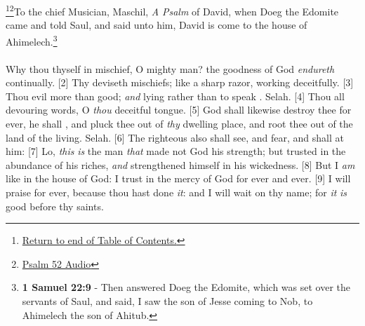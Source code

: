 \footnote{\textcolor[rgb]{0.00,0.25,0.00}{\hyperlink{TOC}{Return to end of Table of Contents.}}}\footnote{\href{https://audiobible.com/bible/psalms_52.html}{\textcolor[cmyk]{0.99998,1,0,0}{Psalm 52 Audio}}}\textcolor[cmyk]{0.99998,1,0,0}{To the chief Musician, Maschil, \emph{A} \emph{Psalm} of David, when Doeg the Edomite came and told Saul, and said unto him, David is come to the house of Ahimelech.}\footnote{\textbf{1 Samuel 22:9} - Then answered Doeg the Edomite, which was set over the servants of Saul, and said, I saw the son of Jesse coming to Nob, to Ahimelech the son of Ahitub.}\\
\\
\textcolor[cmyk]{0.99998,1,0,0}{Why  thou thyself in mischief, O mighty man? the goodness of God \emph{endureth} continually.}
[2] \textcolor[cmyk]{0.99998,1,0,0}{Thy  deviseth mischiefs; like a sharp razor, working deceitfully.}
[3] \textcolor[cmyk]{0.99998,1,0,0}{Thou  evil more than good; \emph{and} lying rather than to speak . Selah.}
[4] \textcolor[cmyk]{0.99998,1,0,0}{Thou  all devouring words, O \emph{thou} deceitful tongue.}
[5] \textcolor[cmyk]{0.99998,1,0,0}{God shall likewise destroy thee for ever, he shall , and pluck thee out of \emph{thy} dwelling place, and root thee out of the land of the living. Selah.}
[6] \textcolor[cmyk]{0.99998,1,0,0}{The righteous also shall see, and fear, and shall  at him:}
[7] \textcolor[cmyk]{0.99998,1,0,0}{Lo, \emph{this} \emph{is} the man \emph{that} made not God his strength; but trusted in the abundance of his riches, \emph{and} strengthened himself in his wickedness.}
[8] \textcolor[cmyk]{0.99998,1,0,0}{But I \emph{am} like  in the house of God: I trust in the mercy of God for ever and ever.}
[9] \textcolor[cmyk]{0.99998,1,0,0}{I will praise  for ever, because thou hast done \emph{it}: and I will wait on thy name; for \emph{it} \emph{is} good before thy saints.}


